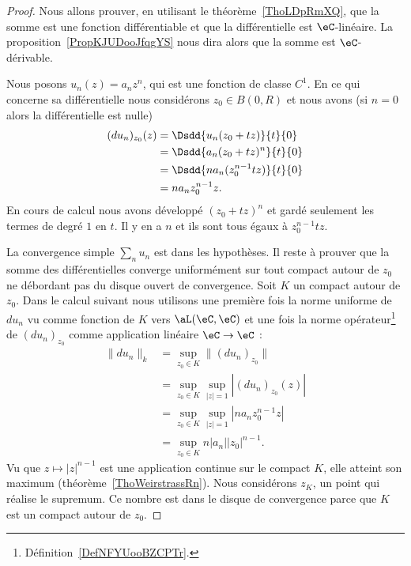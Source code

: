 \begin{proof}
    Nous allons prouver, en utilisant le théorème~\ref{ThoLDpRmXQ}, que la somme est une fonction différentiable et que la différentielle est \( \eC\)-linéaire. La proposition~\ref{PropKJUDooJfqgYS} nous dira alors que la somme est \( \eC\)-dérivable.

    Nous posons \( u_n(z)=a_nz^n\), qui est une fonction de classe \( C^1\). En ce qui concerne sa différentielle nous considérons \( z_0\in B(0,R)\)  et nous avons    (si \( n=0\) alors la différentielle est nulle)
    \begin{subequations}
        \begin{align}
            (du_n)_{z_0}(z)&=\Dsdd{ u_n(z_0+tz) }{t}{0}\\
            &=\Dsdd{ a_n(z_0+tz)^n }{t}{0}\\
            &=\Dsdd{ na_n(z_0^{n-1}tz) }{t}{0}\\
            &=na_nz_0^{n-1}z.
        \end{align}
    \end{subequations}
    En cours de calcul nous avons développé \( (z_0+tz)^n\) et gardé seulement les termes de degré \( 1\) en \( t\). Il y en a \( n\) et ils sont tous égaux à \( z_0^{n-1}tz\).

    La convergence simple \( \sum_nu_n\) est dans les hypothèses. Il reste à prouver que la somme des différentielles converge uniformément sur tout compact autour de \( z_0\) ne débordant pas du disque ouvert de convergence. Soit \( K\) un compact autour de \( z_0\). Dans le calcul suivant nous utilisons une première fois la norme uniforme de \( du_n\) vu comme fonction de \( K\) vers \( \aL(\eC,\eC)\) et une fois la norme opérateur\footnote{Définition~\ref{DefNFYUooBZCPTr}.} de \( (du_n)_{z_0}\) comme application linéaire \( \eC\to \eC\) :
    \begin{subequations}
        \begin{align}
            \| du_n \|_k&=\sup_{z_0\in K}\| (du_n)_{z_0} \|\\
            &=\sup_{z_0\in K}\sup_{| z |=1}| (du_n)_{z_0}(z) |\\
            &=\sup_{z_0\in K}\sup_{| z |=1}| na_nz_0^{n-1}z |\\
            &=\sup_{z_0\in K}n| a_n | |z_0 |^{n-1}.
        \end{align}
    \end{subequations}
    Vu que \( z\mapsto| z |^{n-1}\) est une application continue sur le compact \( K\), elle atteint son maximum (théorème~\ref{ThoWeirstrassRn}). Nous considérons \( z_K\), un point qui réalise le supremum. Ce nombre est dans le disque de convergence parce que \( K\) est un compact autour de \( z_0\).


\end{proof}
